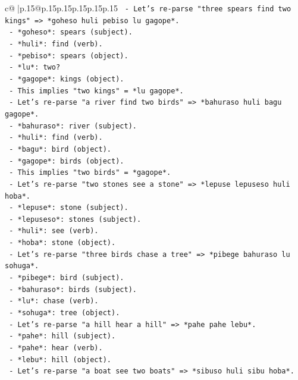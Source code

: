 \documentclass{article}
\begin{document}
{\begin{supertabular}{c@{$\;$}|p{.15\linewidth}@{}p{.15\linewidth}p{.15\linewidth}p{.15\linewidth}p{.15\linewidth}p{.15\linewidth}}
{{{\texttt{    {-} Let's re{-}parse "three spears find two kings" => *goheso huli pebiso lu gagope*.} \\
\texttt{      {-} *goheso*: spears (subject).} \\
\texttt{      {-} *huli*: find (verb).} \\
\texttt{      {-} *pebiso*: spears (object).} \\
\texttt{      {-} *lu*: two?} \\
\texttt{      {-} *gagope*: kings (object).} \\
\texttt{      {-} This implies "two kings" = *lu gagope*.} \\
\texttt{    {-} Let's re{-}parse "a river find two birds" => *bahuraso huli bagu gagope*.} \\
\texttt{      {-} *bahuraso*: river (subject).} \\
\texttt{      {-} *huli*: find (verb).} \\
\texttt{      {-} *bagu*: bird (object).} \\
\texttt{      {-} *gagope*: birds (object).} \\
\texttt{      {-} This implies "two birds" = *gagope*.} \\
\texttt{    {-} Let's re{-}parse "two stones see a stone" => *lepuse lepuseso huli hoba*.} \\
\texttt{      {-} *lepuse*: stone (subject).} \\
\texttt{      {-} *lepuseso*: stones (subject).} \\
\texttt{      {-} *huli*: see (verb).} \\
\texttt{      {-} *hoba*: stone (object).} \\
\texttt{    {-} Let's re{-}parse "three birds chase a tree" => *pibege bahuraso lu sohuga*.} \\
\texttt{      {-} *pibege*: bird (subject).} \\
\texttt{      {-} *bahuraso*: birds (subject).} \\
\texttt{      {-} *lu*: chase (verb).} \\
\texttt{      {-} *sohuga*: tree (object).} \\
\texttt{    {-} Let's re{-}parse "a hill hear a hill" => *pahe pahe lebu*.} \\
\texttt{      {-} *pahe*: hill (subject).} \\
\texttt{      {-} *pahe*: hear (verb).} \\
\texttt{      {-} *lebu*: hill (object).} \\
\texttt{    {-} Let's re{-}parse "a boat see two boats" => *sibuso huli sibu hoba*.} \\
}}}
\end{supertabular}}
\end{document}
